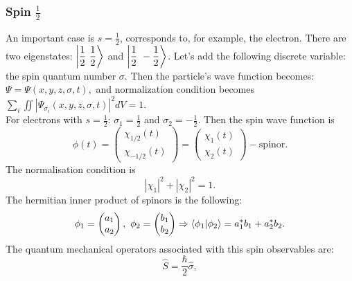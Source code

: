 \documentclass[a4paper, 12pt]{article}
\begin{document}
\subsubsection{Spin $\frac{1}{2}$}
An important case is $s = \frac{1}{2}$, corresponds to, for example,  the electron. There are two eigenstates: $\displaystyle{\ket{\frac{1}{2} ~ \frac{1}{2}}}$ and $\displaystyle{\ket{\frac{1}{2} ~ -\frac{1}{2}}}
$. %
Let's add the following discrete variable: the spin quantum number $\sigma.$ Then the particle's wave function becomes:
$\Psi = \Psi(x,y,z, \sigma, t), $ and normalization condition becomes $\displaystyle{\sum_i \iint |\Psi_{\sigma_i} (x,y,z, \sigma, t)|^2dV=1}.$ \\
For electrons with $s = \frac{1}{2}$: $\sigma_1 = \frac{1}{2}$ and $\sigma_2 = -\frac{1}{2}$. Then  the spin wave function is
$$\displaystyle{\phi(t) = 
\begin{pmatrix}
	\chi_{1/2}(t) \\
	\chi_{-1/2}(t)
\end{pmatrix} = 
\begin{pmatrix}
	\chi_1 (t) \\
	\chi_2(t)
\end{pmatrix}} - \text{spinor}.$$
The normalisation condition is
$$|\chi_1| ^2 + |\chi_2|^2 =1.$$
The hermitian inner product of spinors is the following:
$$\phi_1 = \begin{pmatrix}
	a_1 \\
	a_2
\end{pmatrix}, ~ \phi_2 = \begin{pmatrix}
	b_1 \\
	b_2
\end{pmatrix} \Rightarrow \bra{\phi_1}\ket{\phi_2} = a_1^* b_1 + a_2^* b_2.$$
The quantum mechanical operators associated with this spin observables are:
$$\hat{S}  = \frac{\hbar}{2} \hat{ \sigma},$$
\end{document}

